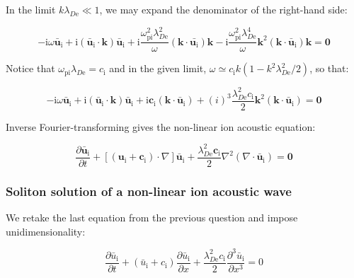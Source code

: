 In the limit $k\lambda_{D\text{e}}\ll1$, we may expand the denominator of the right-hand side:

\begin{equation}
    -\mathrm{i}\omega\bar{\mathbf{u}}_\mathrm{i}+\mathrm{i}(\bar{\mathbf{u}}_\mathrm{i}\cdot\mathbf{k})\bar{\mathbf{u}}_\mathrm{i}+\mathrm{i}\frac{\omega_\text{pi}^2\lambda_{D\text{e}}^2}{\omega}(\mathbf{k}\cdot\bar{\mathbf{u}_\mathrm{i}})\mathbf{k}-\mathrm{i}\frac{\omega_\text{pi}^2\lambda_{D\text{e}}^4}{\omega}\mathbf{k}^2(\mathbf{k}\cdot\bar{\mathbf{u}}_\mathrm{i})\mathbf{k}=\mathbf{0}
\end{equation}

Notice that $\omega_\text{pi}\lambda_{D\text{e}}=c_\mathrm{i}$ and in the given limit, $\omega\simeq c_\mathrm{i}k(1-k^2\lambda_{D\text{e}}^2/2)$, so that:

\begin{equation}
    -\mathrm{i}\omega\bar{\mathbf{u}}_\mathrm{i}+\mathrm{i}(\bar{\mathbf{u}}_\mathrm{i}\cdot\mathbf{k})\bar{\mathbf{u}}_\mathrm{i}+\mathrm{i}\mathbf{c}_\mathrm{i}(\mathbf{k}\cdot\bar{\mathbf{u}}_\mathrm{i})+(i)^3\frac{\lambda_{D\text{e}}^2c_\mathrm{i}}{2}\mathbf{k}^2(\mathbf{k}\cdot\bar{\mathbf{u}}_\mathrm{i})=\mathbf{0}
\end{equation}

Inverse Fourier-transforming gives the non-linear ion acoustic equation:

\begin{equation}
    \frac{\partial\bar{\mathbf{u}}_\mathrm{i}}{\partial t}+\left[(\mathbf{u}_\mathrm{i}+\mathbf{c}_\mathrm{i})\cdot\nabla\right]\bar{\mathbf{u}}_\mathrm{i}+\frac{\lambda_{D\text{e}}^2\mathbf{c}_\mathrm{i}}{2}\nabla^2(\nabla\cdot\bar{\mathbf{u}}_\mathrm{i})=\mathbf{0}
\end{equation}

\subsubsection{Soliton solution of a non-linear ion acoustic wave}

We retake the last equation from the previous question and impose unidimensionality:

\begin{equation}
    \frac{\partial\bar{u}_\mathrm{i}}{\partial t}+(\bar{u}_\mathrm{i}+c_\mathrm{i})\frac{\partial\bar{u}_\mathrm{i}}{\partial x}+\frac{\lambda_{D\text{e}}^2c_\mathrm{i}}{2}\frac{\partial^3\bar{u}_\mathrm{i}}{\partial x^3}=0
\end{equation}

